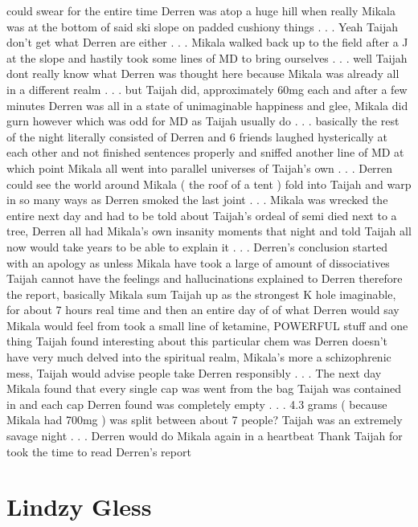 \documentclass[12pt]{book}
\begin{document}
could swear for the entire time Derren was atop a huge hill when really Mikala was at the bottom of said ski slope on padded cushiony things . . .  Yeah Taijah don't get what Derren are either . . .  Mikala walked back up to the field after a J at the slope and hastily took some lines of MD to bring ourselves . . .  well Taijah dont really know what Derren was thought here because Mikala was already all in a different realm . . .  but Taijah did, approximately 60mg each and after a few minutes Derren was all in a state of unimaginable happiness and glee, Mikala did gurn however which was odd for MD as Taijah usually do . . .  basically the rest of the night literally consisted of Derren and 6 friends laughed hysterically at each other and not finished sentences properly and sniffed another line of MD at which point Mikala all went into parallel universes of Taijah's own . . .  Derren could see the world around Mikala ( the roof of a tent ) fold into Taijah and warp in so many ways as Derren smoked the last joint . . .  Mikala was wrecked the entire next day and had to be told about Taijah's ordeal of semi died next to a tree, Derren all had Mikala's own insanity moments that night and told Taijah all now would take years to be able to explain it . . .  Derren's conclusion started with an apology as unless Mikala have took a large of amount of dissociatives Taijah cannot have the feelings and hallucinations explained to Derren therefore the report, basically Mikala sum Taijah up as the strongest K hole imaginable, for about 7 hours real time and then an entire day of of what Derren would say Mikala would feel from took a small line of ketamine, POWERFUL stuff and one thing Taijah found interesting about this particular chem was Derren doesn't have very much delved into the spiritual realm, Mikala's more a schizophrenic mess, Taijah would advise people take Derren responsibly . . .  The next day Mikala found that every single cap was went from the bag Taijah was contained in and each cap Derren found was completely empty . . .  4.3 grams ( because Mikala had 700mg ) was split between about 7 people? Taijah was an extremely savage night . . .  Derren would do Mikala again in a heartbeat Thank Taijah for took the time to read Derren's report



\chapter{Lindzy Gless}
\end{document}

